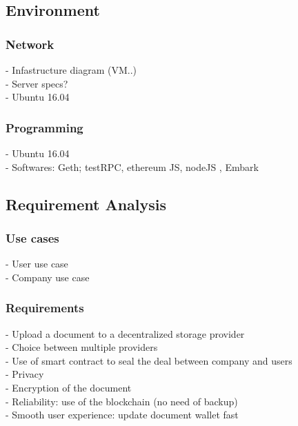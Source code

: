 \subsection{Environment}

\subsubsection{Network}

- Infastructure diagram (VM..)
\\
- Server specs?
\\
- Ubuntu 16.04 

\subsubsection{Programming}

- Ubuntu 16.04
\\
- Softwares: Geth; testRPC, ethereum JS, nodeJS , Embark 

\subsection{Requirement Analysis}

\subsubsection{Use cases}

- User use case
\\
- Company use case
\subsubsection{Requirements}

- Upload a document to a decentralized storage provider
\\
- Choice between multiple providers
\\
- Use of smart contract to seal the deal between company and users
\\
- Privacy
\\
- Encryption of the document
\\
- Reliability: use of the blockchain (no need of backup)
\\
- Smooth user experience: update document wallet fast

